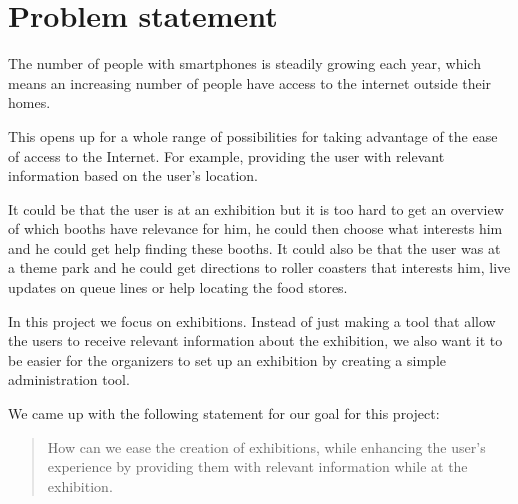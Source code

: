 \section{Problem statement}\label{sec:problemstatement}

The number of people with smartphones is steadily growing each year\citep{smartphonenumber}, which means an increasing number of people have access to the internet outside their homes.

This opens up for a whole range of possibilities for taking advantage of the ease of access to the Internet. For example, providing the user with relevant information based on the user's location. 

It could be that the user is at an exhibition but it is too hard to get an overview of which booths have relevance for him, he could then choose what interests him and he could get help finding these booths. It could also be that the user was at a theme park and he could get directions to roller coasters that interests him, live updates on queue lines or help locating the food stores.

In this project we focus on exhibitions. Instead of just making a tool that allow the users to receive relevant information about the exhibition, we also want it to be easier for the organizers to set up an exhibition by creating a simple administration tool.

We came up with the following statement for our goal for this project:

\begin{quote}
How can we ease the creation of exhibitions, while enhancing the user's experience by providing them with relevant information while at the exhibition.
\end{quote}

